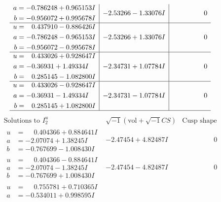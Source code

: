 \documentclass[1p]{elsarticle_modified}
\theoremstyle{definition}
\newcommand{\I}{\sqrt{-1}}
\begin{document}
$$\begin{array}{c|c|c}
\begin{aligned}
a &= -0.786248 + 0.965153 I \\
b &= -0.956072 + 0.995678 I\end{aligned}
 & -2.53266 - 1.33076 I & \phantom{-0.000000 } 0 \\ \hline\begin{aligned}
u &= \phantom{-}0.437910 - 0.886426 I \\
a &= -0.786248 - 0.965153 I \\
b &= -0.956072 - 0.995678 I\end{aligned}
 & -2.53266 + 1.33076 I & \phantom{-0.000000 } 0 \\ \hline\begin{aligned}
u &= \phantom{-}0.433026 + 0.928647 I \\
a &= -0.36931 + 1.49334 I \\
b &= \phantom{-}0.285145 - 1.082800 I\end{aligned}
 & -2.34731 + 1.07784 I & \phantom{-0.000000 } 0 \\ \hline\begin{aligned}
u &= \phantom{-}0.433026 - 0.928647 I \\
a &= -0.36931 - 1.49334 I \\
b &= \phantom{-}0.285145 + 1.082800 I\end{aligned}
 & -2.34731 - 1.07784 I & \phantom{-0.000000 } 0\\
 \hline 
 \end{array}$$\newpage$$\begin{array}{c|c|c}  
\text{Solutions to }I^u_{2}& \I (\text{vol} + \sqrt{-1}CS) & \text{Cusp shape}\\
 \hline 
\begin{aligned}
u &= \phantom{-}0.404366 + 0.884641 I \\
a &= -2.07074 + 1.38245 I \\
b &= -0.767699 - 1.008430 I\end{aligned}
 & -2.47454 + 4.82487 I & \phantom{-0.000000 } 0 \\ \hline\begin{aligned}
u &= \phantom{-}0.404366 - 0.884641 I \\
a &= -2.07074 - 1.38245 I \\
b &= -0.767699 + 1.008430 I\end{aligned}
 & -2.47454 - 4.82487 I & \phantom{-0.000000 } 0 \\ \hline\begin{aligned}
u &= \phantom{-}0.755781 + 0.710365 I \\
a &= -0.534011 + 0.998595 I \\

\end{aligned}
\end{array}$$
\end{document}
